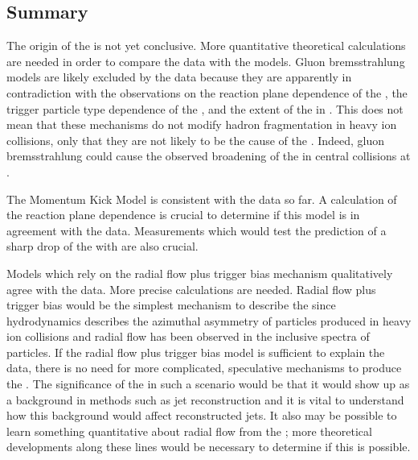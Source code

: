 % 
\subsection{Summary}
The origin of the \ridge is not yet conclusive.  More quantitative theoretical calculations are needed in order to compare the data with the models.  Gluon bremsstrahlung models are likely excluded by the data because they are apparently in contradiction with the observations on the reaction plane dependence of the \ridge, the trigger particle type dependence of the \ridge, and the extent of the \ridge in \deta.  This does not mean that these mechanisms do not modify hadron fragmentation in heavy ion collisions, only that they are not likely to be the cause of the \ridge.  Indeed, gluon bremsstrahlung could cause the observed broadening of the \jlc in central \Au collisions at \sNNtwohundred.

The Momentum Kick Model is consistent with the data so far.  A calculation of the reaction plane dependence is crucial to determine if this model is in agreement with the data. Measurements which would test the prediction of a sharp drop of the \ridge with \deta are also crucial.

Models which rely on the radial flow plus trigger bias mechanism qualitatively agree with the data.  More precise calculations are needed.  Radial flow plus trigger bias would be the simplest mechanism to describe the \ridge since hydrodynamics describes the azimuthal asymmetry of particles produced in heavy ion collisions and radial flow has been observed in the inclusive spectra of particles.  If the radial flow plus trigger bias model is sufficient to explain the data, there is no need for more complicated, speculative mechanisms to produce the \ridge.  The significance of the \ridge in such a scenario would be that it would show up as a background in methods such as jet reconstruction and it is vital to understand how this background would affect reconstructed jets.  It also may be possible to learn something quantitative about radial flow from the \ridge; more theoretical developments along these lines would be necessary to determine if this is possible.
